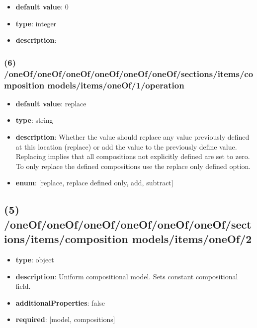 \begin{itemize}[leftmargin=7em]\item {\bf default value}: 0
\item {\bf type}: integer
\item {\bf description}: 
\end{itemize}\subsubsection{(6) /oneOf/oneOf/oneOf/oneOf/oneOf/oneOf/sections/items/composition models/items/oneOf/1/operation}
\begin{itemize}[leftmargin=6em]\item {\bf default value}: replace
\item {\bf type}: string
\item {\bf description}: Whether the value should replace any value previously defined at this location (replace) or add the value to the previously define value. Replacing implies that all compositions not explicitly defined are set to zero. To only replace the defined compositions use the replace only defined option.
\item {\bf enum}: [replace, replace defined only, add, subtract]\end{itemize}\subsection{(5) /oneOf/oneOf/oneOf/oneOf/oneOf/oneOf/sections/items/composition models/items/oneOf/2}
\begin{itemize}[leftmargin=5em]\item {\bf type}: object
\item {\bf description}: Uniform compositional model. Sets constant compositional field.
\item {\bf additionalProperties}: false
\item {\bf required}: [model, compositions]\end{itemize}
